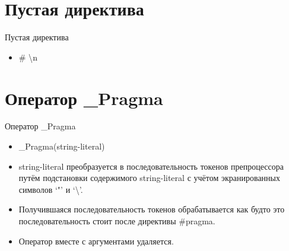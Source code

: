     \section{Пустая директива}
    \begin{frame}{Пустая директива}
        \begin{itemize}
            \item \# \textbackslash{n}
        \end{itemize}
    \end{frame}

    \section{Оператор \_Pragma}
    \begin{frame}{Оператор \_Pragma}
        \begin{itemize}
            \item \_Pragma(string-literal)
            \item string-literal преобразуется в последовательность токенов препроцессора путём подстановки
                содержимого string-literal с учётом экранированных символов `"' и `\textbackslash'.
            \item Получившаяся последовательность токенов обрабатывается как будто это последовательность
                стоит после директивы \#pragma.
            \item Оператор вместе с аргументами удаляется.
        \end{itemize}
    \end{frame}

